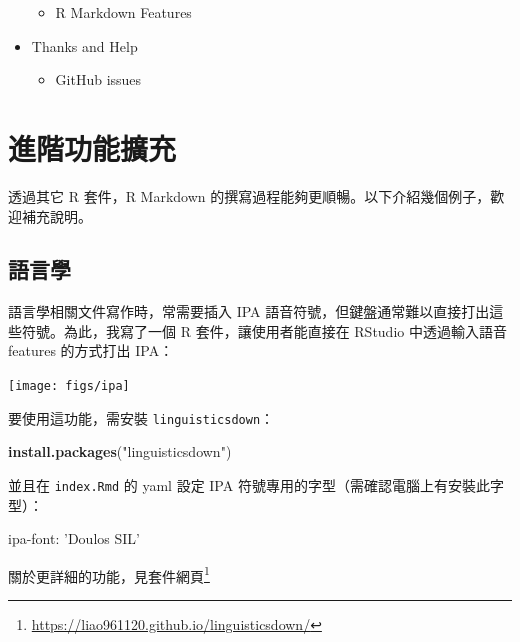 \documentclass[oneside]{book}
\newenvironment{Shaded}{\begin{snugshade}}{\end{snugshade}}
\newcommand{\KeywordTok}[1]{\textcolor[rgb]{0.13,0.29,0.53}{\textbf{#1}}}
\newcommand{\StringTok}[1]{\textcolor[rgb]{0.31,0.60,0.02}{#1}}
\newcommand{\FunctionTok}[1]{\textcolor[rgb]{0.00,0.00,0.00}{#1}}
\newcommand{\AttributeTok}[1]{\textcolor[rgb]{0.77,0.63,0.00}{#1}}
\newcommand{\NormalTok}[1]{#1}
\renewcommand{\href}[2]{#2\footnote{\url{#1}}}
\providecommand{\tightlist}{%
  \setlength{\itemsep}{0pt}\setlength{\parskip}{0pt}}
\theoremstyle{definition}
\theoremstyle{definition}
\theoremstyle{definition}
\theoremstyle{remark}
\begin{document}
\begin{itemize}
  \begin{itemize}
  \tightlist
  \item
    R Markdown Features
  \end{itemize}
\item
  Thanks and Help

  \begin{itemize}
  \tightlist
  \item
    GitHub issues
  \end{itemize}
\end{itemize}

\chapter{進階功能擴充}\label{add-on}

透過其它 R 套件，R Markdown
的撰寫過程能夠更順暢。以下介紹幾個例子，歡迎補充說明。

\section{語言學}\label{ling}

語言學相關文件寫作時，常需要插入 IPA
語音符號，但鍵盤通常難以直接打出這些符號。為此，我寫了一個 R
套件，讓使用者能直接在 RStudio 中透過輸入語音 features 的方式打出 IPA：

\begin{center}\texttt{[image: figs/ipa]} \end{center}

要使用這功能，需安裝 \texttt{linguisticsdown}：

\begin{Shaded}
\begin{Highlighting}[]
\KeywordTok{install.packages}\NormalTok{(}\StringTok{"linguisticsdown"}\NormalTok{)}
\end{Highlighting}
\end{Shaded}

並且在 \texttt{index.Rmd} 的 yaml 設定 IPA
符號專用的字型（需確認電腦上有安裝此字型）：

\begin{Shaded}
\begin{Highlighting}[]
\FunctionTok{ipa-font:}\AttributeTok{ }\StringTok{'Doulos SIL'}
\end{Highlighting}
\end{Shaded}

關於更詳細的功能，見\href{https://liao961120.github.io/linguisticsdown/}{套件網頁}
\end{document}
